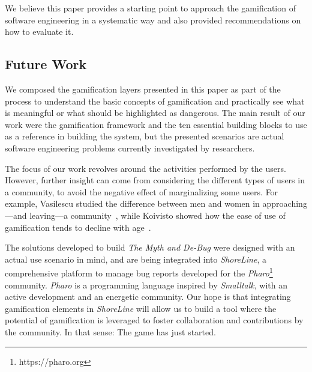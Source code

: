 We believe this paper provides a starting point to approach the gamification of software engineering in a systematic way and also provided recommendations on how to evaluate it.

\subsection{Future Work}

We composed the gamification layers presented in this paper as part of the process to understand the basic concepts of gamification and practically see what is meaningful or what should be highlighted as dangerous.
The main result of our work were the gamification framework and the ten essential building blocks to use as a reference in building the system, but the presented scenarios are actual software engineering problems currently investigated by researchers.

The focus of our work revolves around the activities performed by the users.
However, further insight can come from considering the different types of users in a community, to avoid the negative effect of marginalizing some users.
For example, Vasilescu \etal studied the difference between men and women in approaching---and leaving---a community~\cite{vasi2012}, while Koivisto \etal showed how the ease of use of gamification tends to decline with age~\cite{koiv2014}.


The solutions developed to build \textit{The Myth and De-Bug} were designed with an actual use scenario in mind, and are being integrated into \textit{ShoreLine}, a comprehensive platform to manage bug reports developed for the \textit{Pharo}\footnote{https://pharo.org} community.
\textit{Pharo} is a programming language inspired by \textit{Smalltalk}, with an active development and an energetic community.
Our hope is that integrating gamification elements in \textit{ShoreLine} will allow us to build a tool where the potential of gamification is leveraged to foster collaboration and contributions by the community.
In that sense: The game has just started.
